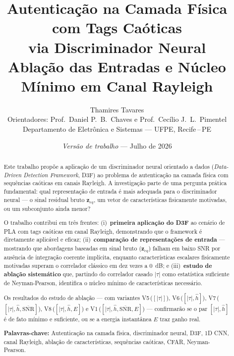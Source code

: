 \documentclass[12pt,a4paper]{article}
\begin{document}
\title{\textbf{Autenticação na Camada Física com Tags Caóticas\\via Discriminador Neural}\\[0.5em]
\large Ablação das Entradas e Núcleo Mínimo em Canal Rayleigh}

\author{Thamires Tavares\\[0.4em]
\small Orientadores: Prof.\ Daniel P.\ B.\ Chaves e Prof.\ Cecílio J.\ L.\ Pimentel\\
\small Departamento de Eletrônica e Sistemas --- UFPE, Recife\,--\,PE}

\date{\textit{Versão de trabalho} --- Julho de 2026}

\maketitle
\thispagestyle{empty}


\renewcommand{\abstractname}{Resumo}
\begin{abstract}
\noindent
Este trabalho propõe a aplicação de um discriminador neural orientado a dados (\textit{Data-Driven Detection Framework}, D3F) ao problema de autenticação na camada física com sequências caóticas em canais Rayleigh. A investigação parte de uma pergunta prática fundamental: qual representação de entrada é mais adequada para o discriminador neural --- o sinal residual bruto $\mathbf{z}_{eq}$, um vetor de características fisicamente motivadas, ou um subconjunto ainda menor?

O trabalho contribui em três frentes: (i)~\textbf{primeira aplicação do D3F} ao cenário de PLA com tags caóticas em canal Rayleigh, demonstrando que o framework é diretamente aplicável e eficaz; (ii)~\textbf{comparação de representações de entrada} --- mostrando que abordagens baseadas em sinal bruto ($\mathbf{z}_{eq}$) falham em baixo SNR por ausência de integração coerente implícita, enquanto características escalares fisicamente motivadas superam o correlador clássico em dez vezes a 0~dB; e (iii)~\textbf{estudo de ablação sistemático} que, partindo do correlador casado $|\tau|$ como estatística suficiente de Neyman-Pearson, identifica o núcleo mínimo de características necessário.

Os resultados do estudo de ablação --- com variantes V5\,($[|\tau|]$), V6\,($[|\tau|, \hat{h}]$), V7\,($[|\tau|, \hat{h}, \overline{\text{SNR}}]$), V8\,($[|\tau|, \hat{h}, E]$) e V1\,($[|\tau|, \hat{h}, \overline{\text{SNR}}, E]$) --- confirmarão se o par $[|\tau|, \hat{h}]$ é de fato mínimo e suficiente, ou se a energia instantânea $E$ traz ganho real.

\vspace{0.8em}
\noindent\textbf{Palavras-chave:} Autenticação na camada física, discriminador neural, D3F, 1D CNN, canal Rayleigh, ablação de características, sequências caóticas, CFAR, Neyman-Pearson.
\end{abstract}
\end{document}
